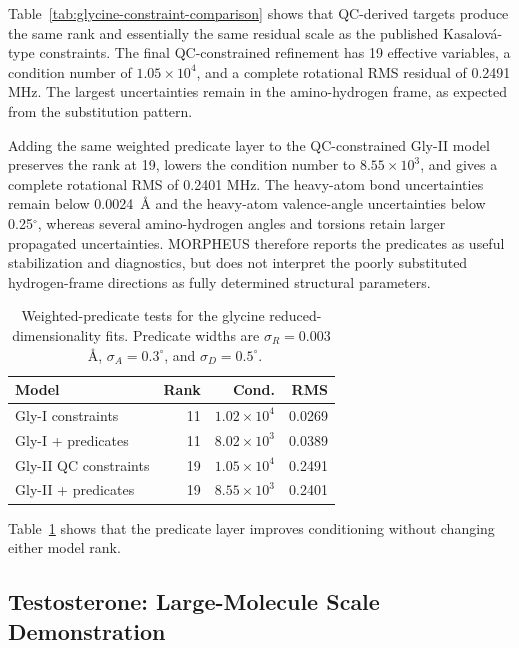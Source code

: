 \documentclass[aip,jcp,reprint,longbibliography,floatfix]{revtex4-2}
\begin{document}
Table~\ref{tab:glycine-constraint-comparison} shows that QC-derived targets
produce the same rank and essentially the same residual scale as the published
Kasalov{\'a}-type constraints. The final QC-constrained refinement has 19
effective variables, a condition number of $1.05\times10^4$, and a complete
rotational RMS residual of 0.2491 MHz. The largest uncertainties remain in the
amino-hydrogen frame, as expected from the substitution pattern.

Adding the same weighted predicate layer to the QC-constrained Gly-II model
preserves the rank at 19, lowers the condition number to $8.55\times10^3$, and
gives a complete rotational RMS of 0.2401 MHz. The heavy-atom bond
uncertainties remain below 0.0024~\AA{} and the heavy-atom valence-angle
uncertainties below 0.25$^\circ$, whereas several amino-hydrogen angles and
torsions retain larger propagated uncertainties. MORPHEUS therefore reports
the predicates as useful stabilization and diagnostics, but does not interpret
the poorly substituted hydrogen-frame directions as fully determined structural
parameters.

\begin{table}[t]
\caption{Weighted-predicate tests for the glycine reduced-dimensionality fits.
Predicate widths are $\sigma_R=0.003$~\AA{}, $\sigma_A=0.3^\circ$, and
$\sigma_D=0.5^\circ$.}
\label{tab:glycine-predicate-checks}
\centering
\small
\setlength{\tabcolsep}{3pt}
\begin{tabular}{lrrr}
\toprule
Model & Rank & Cond. & RMS \\
\midrule
Gly-I constraints & 11 & $1.02\times10^4$ & 0.0269 \\
Gly-I + predicates & 11 & $8.02\times10^3$ & 0.0389 \\
Gly-II QC constraints & 19 & $1.05\times10^4$ & 0.2491 \\
Gly-II + predicates & 19 & $8.55\times10^3$ & 0.2401 \\
\bottomrule
\end{tabular}
\end{table}

Table~\ref{tab:glycine-predicate-checks} shows that the predicate layer
improves conditioning without changing either model rank.

\subsection{Testosterone: Large-Molecule Scale Demonstration}
\end{document}
